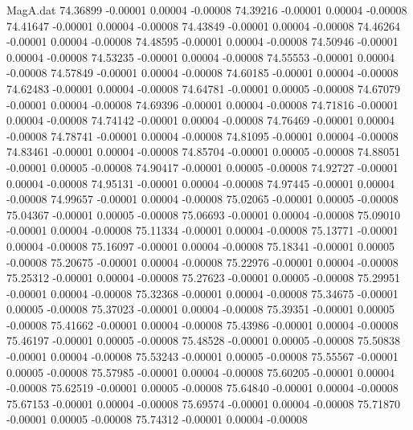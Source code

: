 \begin{filecontents}{MagA.dat}
  74.36899   -0.00001    0.00004   -0.00008
  74.39216   -0.00001    0.00004   -0.00008
  74.41647   -0.00001    0.00004   -0.00008
  74.43849   -0.00001    0.00004   -0.00008
  74.46264   -0.00001    0.00004   -0.00008
  74.48595   -0.00001    0.00004   -0.00008
  74.50946   -0.00001    0.00004   -0.00008
  74.53235   -0.00001    0.00004   -0.00008
  74.55553   -0.00001    0.00004   -0.00008
  74.57849   -0.00001    0.00004   -0.00008
  74.60185   -0.00001    0.00004   -0.00008
  74.62483   -0.00001    0.00004   -0.00008
  74.64781   -0.00001    0.00005   -0.00008
  74.67079   -0.00001    0.00004   -0.00008
  74.69396   -0.00001    0.00004   -0.00008
  74.71816   -0.00001    0.00004   -0.00008
  74.74142   -0.00001    0.00004   -0.00008
  74.76469   -0.00001    0.00004   -0.00008
  74.78741   -0.00001    0.00004   -0.00008
  74.81095   -0.00001    0.00004   -0.00008
  74.83461   -0.00001    0.00004   -0.00008
  74.85704   -0.00001    0.00005   -0.00008
  74.88051   -0.00001    0.00005   -0.00008
  74.90417   -0.00001    0.00005   -0.00008
  74.92727   -0.00001    0.00004   -0.00008
  74.95131   -0.00001    0.00004   -0.00008
  74.97445   -0.00001    0.00004   -0.00008
  74.99657   -0.00001    0.00004   -0.00008
  75.02065   -0.00001    0.00005   -0.00008
  75.04367   -0.00001    0.00005   -0.00008
  75.06693   -0.00001    0.00004   -0.00008
  75.09010   -0.00001    0.00004   -0.00008
  75.11334   -0.00001    0.00004   -0.00008
  75.13771   -0.00001    0.00004   -0.00008
  75.16097   -0.00001    0.00004   -0.00008
  75.18341   -0.00001    0.00005   -0.00008
  75.20675   -0.00001    0.00004   -0.00008
  75.22976   -0.00001    0.00004   -0.00008
  75.25312   -0.00001    0.00004   -0.00008
  75.27623   -0.00001    0.00005   -0.00008
  75.29951   -0.00001    0.00004   -0.00008
  75.32368   -0.00001    0.00004   -0.00008
  75.34675   -0.00001    0.00005   -0.00008
  75.37023   -0.00001    0.00004   -0.00008
  75.39351   -0.00001    0.00005   -0.00008
  75.41662   -0.00001    0.00004   -0.00008
  75.43986   -0.00001    0.00004   -0.00008
  75.46197   -0.00001    0.00005   -0.00008
  75.48528   -0.00001    0.00005   -0.00008
  75.50838   -0.00001    0.00004   -0.00008
  75.53243   -0.00001    0.00005   -0.00008
  75.55567   -0.00001    0.00005   -0.00008
  75.57985   -0.00001    0.00004   -0.00008
  75.60205   -0.00001    0.00004   -0.00008
  75.62519   -0.00001    0.00005   -0.00008
  75.64840   -0.00001    0.00004   -0.00008
  75.67153   -0.00001    0.00004   -0.00008
  75.69574   -0.00001    0.00004   -0.00008
  75.71870   -0.00001    0.00005   -0.00008
  75.74312   -0.00001    0.00004   -0.00008

\end{filecontents}
